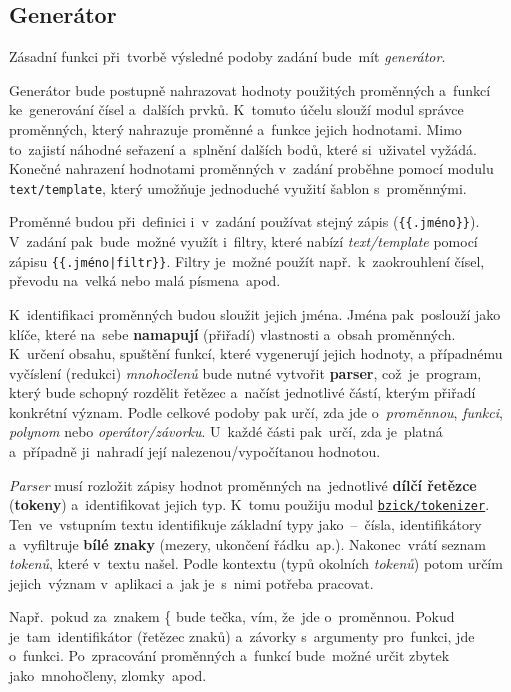 \documentclass[11pt,a4paper]{report}
\begin{document}
        \subsection{Generátor}
            Zásadní funkci při~tvorbě výsledné podoby zadání bude~mít \emph{generátor}.
            
            Generátor bude postupně nahrazovat hodnoty použitých proměnných a~funkcí ke~generování čísel a~dalších prvků. K~tomuto účelu slouží modul správce proměnných, který nahrazuje proměnné a~funkce jejich hodnotami. Mimo to~zajistí náhodné seřazení a~splnění dalších bodů, které si~uživatel vyžádá. Konečné nahrazení hodnotami proměnných v~zadání proběhne pomocí modulu \texttt{text/template}, který umožňuje jednoduché využití šablon s~proměnnými.
            
            Proměnné budou při~definici i~v~zadání používat stejný zápis (\texttt{\{\{.jméno\}\}}). V~zadání pak~bude~možné využít i~filtry, které nabízí \emph{text/template} pomocí zápisu \texttt{\{\{.jméno|filtr\}\}}. Filtry je~možné použít např.~k~zaokrouhlení čísel, převodu na~velká nebo malá písmena~apod.

            K~identifikaci proměnných budou sloužit jejich jména. Jména pak~poslouží jako klíče, které na~sebe \textbf{namapují} (přiřadí) vlastnosti a~obsah proměnných. K~určení obsahu, spuštění funkcí, které vygenerují jejich hodnoty, a případnému vyčíslení (redukci) \emph{mnohočlenů} bude nutné vytvořit \textbf{parser}, což~je~program, který bude schopný rozdělit řetězec a~načíst jednotlivé částí, kterým přiřadí konkrétní význam. Podle celkové podoby pak určí, zda jde o~\emph{proměnnou}, \emph{funkci}, \emph{polynom} nebo \emph{operátor/závorku}. U~každé části pak~určí, zda je~platná a~případně ji~nahradí její nalezenou/vypočítanou hodnotou.
            
            \emph{Parser} musí rozložit zápisy hodnot proměnných na~jednotlivé \textbf{dílčí řetězce} (\textbf{tokeny}) a~identifikovat jejich typ. K~tomu použiju modul \href{github.com/bzick/tokenizer}{\texttt{bzick/tokenizer}}. Ten~ve~vstupním textu identifikuje základní typy jako~--~čísla, identifikátory a~vyfiltruje \textbf{bílé znaky} (mezery, ukončení řádku~ap.). Nakonec~vrátí seznam \emph{tokenů}, které v~textu našel. Podle kontextu (typů okolních \emph{tokenů}) potom určím jejich~význam v~aplikaci a~jak je~s~nimi potřeba pracovat.
            
            Např.~pokud za~znakem \{ bude tečka, vím, že~jde o~proměnnou. Pokud je~tam~identifikátor (řetězec znaků) a~závorky s~argumenty pro~funkci, jde o~funkci. Po~zpracování proměnných a~funkcí bude~možné určit zbytek jako~mnohočleny, zlomky~apod.
            
\end{document}
